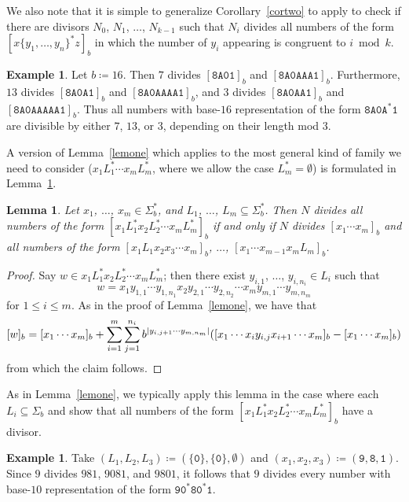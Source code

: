 \documentclass[12pt]{article}
\DeclarePairedDelimiter\abs{\lvert}{\rvert}
\theoremstyle{plain}
\newtheorem{lemma}[theorem]{Lemma}
\theoremstyle{definition}
\newtheorem{example}[theorem]{Example}
\theoremstyle{remark}
\newcommand{\0}{\mathtt{0}}
\newcommand{\1}{\mathtt{1}}
\newcommand{\2}{\mathtt{2}}
\newcommand{\3}{\mathtt{3}}
\newcommand{\4}{\mathtt{4}}
\newcommand{\5}{\mathtt{5}}
\newcommand{\6}{\mathtt{6}}
\newcommand{\7}{\mathtt{7}}
\newcommand{\8}{\mathtt{8}}
\newcommand{\9}{\mathtt{9}}
\newcommand{\A}{\mathtt{A}}
\begin{document}
We also note that it is simple to generalize Corollary~\ref{cortwo}
to apply to 
check if there are divisors $N_0$, $N_1$, $\dotsc$, $N_{k-1}$ such that
$N_i$ divides all numbers of the form $[x\{y_1,\dotsc,y_n\}^*z]_b$ in which 
the number of $y_i$ appearing is congruent to $i\bmod k$.
\begin{example}
Let $b \coloneqq 16$.
Then
$7$ divides $[\8\A\0\1]_b$ and $[\8\A\0\A\A\A\1]_b$.
Furthermore, $13$ divides 
$[\8\A\0\A\1]_b$ and $[\8\A\0\A\A\A\A\1]_b$,
and $3$ divides $[\8\A\0\A\A\1]_b$ and 
$[\8\A\0\A\A\A\A\A\1]_b$.  Thus all numbers with base-$16$
representation of the form $\8\A\0\A^*\1$ are 
divisible by either $7$, $13$, or $3$, depending on their 
length mod $3$.
\end{example}

A version of Lemma~\ref{lemone} which applies to the most general kind 
of family we need to consider ($x_1L_1^*\dotsm x_mL_m^*$, where we allow the case $L_m^*=\emptyset$)
is formulated in Lemma~\ref{lemtwo}.

\begin{lemma}\label{lemtwo}
Let $x_1$, $\dotsc$, $x_m\in \Sigma^*_b$, and $L_1$, $\dotsc$, 
$L_m\subseteq\Sigma^*_b$.  Then
$N$ divides all numbers of the form $[x_1L_1^*x_2L_2^*\dotsm x_mL_m^*]_b$
if and only if
$N$ divides $[x_1\dotsm x_m]_b$ and all numbers of the form 
$[x_1L_1x_2x_3\dotsm x_m]_b$, $\dotsc$, $[x_1\dotsm x_{m-1}x_mL_m]_b$.
\end{lemma}
\begin{proof}
Say $w\in x_1L_1^*x_2L_2^*\dotsm x_mL_m^*$; then there exist
$y_{i,1}$, $\dotsc$, $y_{i,n_i}\in L_i$ such that
\[ w = x_1y_{1,1}\dotsm y_{1,n_1}x_2y_{2,1}\dotsm y_{2,n_2}\dotsm x_m y_{m,1}\dotsm y_{m,n_m} \]
for $1\leq i\leq m$.
As in the proof of Lemma~\ref{lemone}, we have that
\[ [w]_b = [x_1\dotsm x_m]_b + \sum_{i=1}^m\sum_{j=1}^{n_i} b^{\abs{y_{i,j+1}\dotsm y_{m,n_m}}}([x_1\dotsm x_i y_{i,j} x_{i+1}\dotsm x_m]_b-[x_1\dotsm x_m]_b) \]
from which the claim follows.
\end{proof}
As in Lemma~\ref{lemone}, we typically apply this lemma in the case 
where each $L_i\subseteq\Sigma_b$ and show that all numbers of the 
form $[x_1L_1^*x_2L_2^*\dotsm x_mL_m^*]_b$ have a divisor.
\begin{example}
Take $(L_1, L_2, L_3) \coloneqq (\{ \0 \},\{\0\},\emptyset)$ and $(x_1,x_2, x_3) \coloneqq (\9, \8, \1)$.
Since $9$ divides $981$, $9081$, and $9801$, it follows that $9$ 
divides every number with base-$10$ representation
of the form $\9\0^*\8\0^*\1$.
\end{example}
\end{document}

